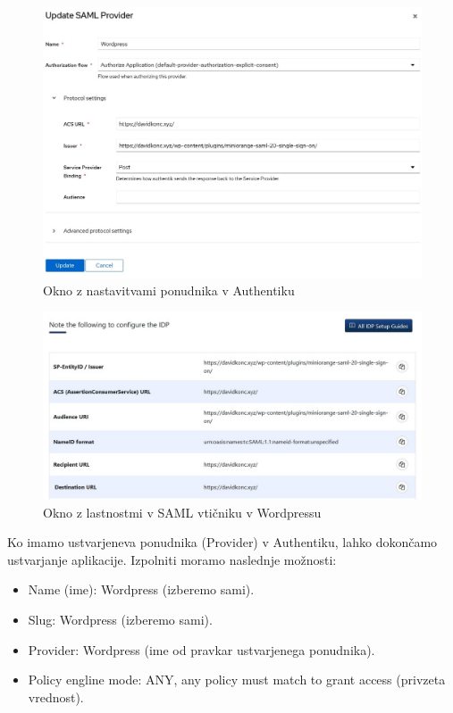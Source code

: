 \documentclass[a4paper,12pt,openright]{book}
\begin{document}
\begin{figure}[H]
\hspace{-1cm}
\includegraphics[scale=0.6]{diploma-FRI-vzorec_11maj2021/SAMLprovi.jpg}
\caption{Okno z nastavitvami ponudnika v Authentiku}
\label{fig}
\end{figure}

\begin{figure}[H]
\hspace{-4cm}
\includegraphics[scale=0.7]{diploma-FRI-vzorec_11maj2021/WordpressSAML.jpg}
\caption{Okno z lastnostmi v SAML vtičniku v Wordpressu}
\label{fig}
\end{figure}

Ko imamo ustvarjeneva ponudnika (Provider) v Authentiku, lahko dokončamo ustvarjanje aplikacije. Izpolniti moramo naslednje možnosti:
\begin{itemize}
    \item Name (ime): Wordpress (izberemo sami).
    \item Slug: Wordpress (izberemo sami).
    \item Provider: Wordpress (ime od pravkar ustvarjenega ponudnika).
    \item Policy engline mode: ANY, any policy must match to grant access (privzeta vrednost). 
\end{itemize}
\end{document}
